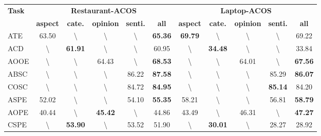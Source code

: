 \documentclass[11pt]{article}
\begin{document}
\begin{table*}[]
\centering
\begin{tabular}{l|ccccc|ccccc}
\toprule
\multirow{2}{*}{\textbf{Task}} &
  \multicolumn{5}{c|}{\textbf{Restaurant-ACOS}} &
  \multicolumn{5}{c}{\textbf{Laptop-ACOS}} \\ \cline{2-11} 
 &
  \textbf{aspect} &
  \textbf{cate.} &
  \textbf{opinion} &
  \multicolumn{1}{c|}{\textbf{senti.}} &
  \textbf{all} &
  \textbf{aspect} &
  \textbf{cate.} &
  \textbf{opinion} &
  \multicolumn{1}{c|}{\textbf{senti.}} &
  \textbf{all} \\ \midrule

ATE &
  63.50 &
  \textbackslash{} &
  \textbackslash{} &
  \multicolumn{1}{c|}{\textbackslash{}} &
  \textbf{65.36} &
  \textbf{69.79} &
  \textbackslash{} &
  \textbackslash{} &
  \multicolumn{1}{c|}{\textbackslash{}} &
  69.22 \\
ACD &
  \textbackslash{} &
  \textbf{61.91} &
  \textbackslash{} &
  \multicolumn{1}{c|}{\textbackslash{}} &
  60.95 &
  \textbackslash{} &
  \textbf{34.48} &
  \textbackslash{} &
  \multicolumn{1}{c|}{\textbackslash{}} &
  33.84 \\
AOOE &
  \textbackslash{} &
  \textbackslash{} &
  64.43 &
  \multicolumn{1}{c|}{\textbackslash{}} &
  \textbf{68.53} &
  \textbackslash{} &
  \textbackslash{} &
  64.01 &
  \multicolumn{1}{c|}{\textbackslash{}} &
  \textbf{67.56} \\ 

ABSC &
  \textbackslash{} &
  \textbackslash{} &
  \textbackslash{} &
  \multicolumn{1}{c|}{86.22} &
  \textbf{87.58} &
  \textbackslash{} &
  \textbackslash{} &
  \textbackslash{} &
  \multicolumn{1}{c|}{85.29} &
  \textbf{86.07} \\
COSC &
  \textbackslash{} &
  \textbackslash{} &
  \textbackslash{} &
  \multicolumn{1}{c|}{84.72} &
  \textbf{84.95} &
  \textbackslash{} &
  \textbackslash{} &
  \textbackslash{} &
  \multicolumn{1}{c|}{\textbf{85.14}} &
  84.20 \\
  
\midrule

ASPE &
  52.02 &
  \textbackslash{} &
  \textbackslash{} &
  \multicolumn{1}{c|}{54.10} &
  \textbf{55.35} &
  58.21 &
  \textbackslash{} &
  \textbackslash{} &
  \multicolumn{1}{c|}{56.81} &
  \textbf{58.79} \\
AOPE &
  40.44 &
  \textbackslash{} &
  \textbf{45.42} &
  \multicolumn{1}{c|}{\textbackslash{}} &
  44.86 &
  43.49 &
  \textbackslash{} &
  46.31 &
  \multicolumn{1}{c|}{\textbackslash{}} &
  \textbf{47.27} \\
CSPE &
  \textbackslash{} &
  \textbf{53.90} &
  \textbackslash{} &
  \multicolumn{1}{c|}{53.52} &
  51.90 &
  \textbackslash{} &
  \textbf{30.01} &
  \textbackslash{} &
  \multicolumn{1}{c|}{28.27} &
  28.92 \\ \midrule


\end{tabular}
\end{table*}
\end{document}
